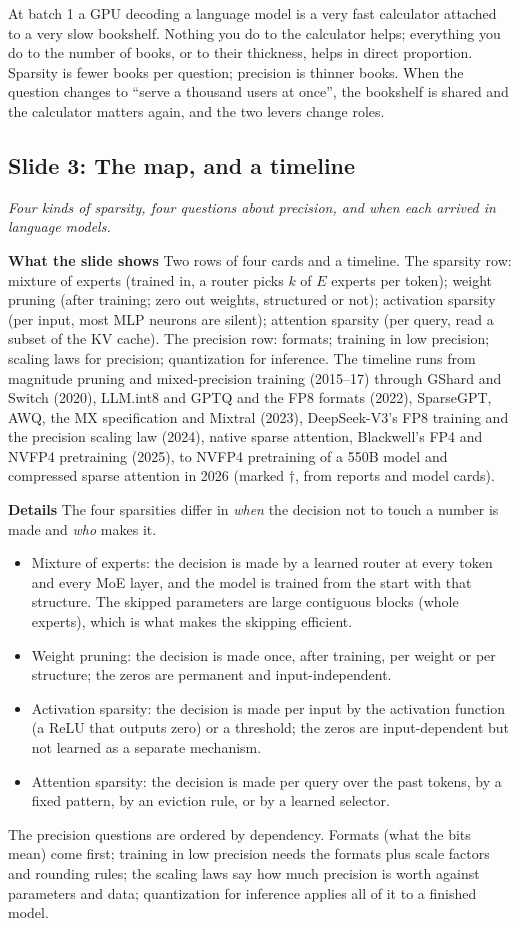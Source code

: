 \documentclass[11pt,letterpaper]{article}
\newcommand{\slide}[3]{%
  \subsection[Slide #1: #2]{Slide #1: #2}%
  {\color{muted}\itshape #3\par}\medskip}
\newcommand{\para}[1]{\medskip\noindent\textbf{#1}\quad}
\newenvironment{intuition}{\begin{tcolorbox}[intuitionbox]}{\end{tcolorbox}}
\begin{document}
\begin{intuition}
At batch 1 a GPU decoding a language model is a very fast calculator attached to a very slow bookshelf. Nothing you do to the calculator helps; everything you do to the number of books, or to their thickness, helps in direct proportion. Sparsity is fewer books per question; precision is thinner books. When the question changes to ``serve a thousand users at once'', the bookshelf is shared and the calculator matters again, and the two levers change roles.
\end{intuition}

\slide{3}{The map, and a timeline}{Four kinds of sparsity, four questions about precision, and when each arrived in language models.}

\para{What the slide shows} Two rows of four cards and a timeline. The sparsity row: mixture of experts (trained in, a router picks $k$ of $E$ experts per token); weight pruning (after training; zero out weights, structured or not); activation sparsity (per input, most MLP neurons are silent); attention sparsity (per query, read a subset of the KV cache). The precision row: formats; training in low precision; scaling laws for precision; quantization for inference. The timeline runs from magnitude pruning and mixed-precision training (2015--17) through GShard and Switch (2020), LLM.int8 and GPTQ and the FP8 formats (2022), SparseGPT, AWQ, the MX specification and Mixtral (2023), DeepSeek-V3's FP8 training and the precision scaling law (2024), native sparse attention, Blackwell's FP4 and NVFP4 pretraining (2025), to NVFP4 pretraining of a 550B model and compressed sparse attention in 2026 (marked $\dagger$, from reports and model cards).

\para{Details} The four sparsities differ in \emph{when} the decision not to touch a number is made and \emph{who} makes it.
\begin{itemize}
  \item Mixture of experts: the decision is made by a learned router at every token and every MoE layer, and the model is trained from the start with that structure. The skipped parameters are large contiguous blocks (whole experts), which is what makes the skipping efficient.
  \item Weight pruning: the decision is made once, after training, per weight or per structure; the zeros are permanent and input-independent.
  \item Activation sparsity: the decision is made per input by the activation function (a ReLU that outputs zero) or a threshold; the zeros are input-dependent but not learned as a separate mechanism.
  \item Attention sparsity: the decision is made per query over the past tokens, by a fixed pattern, by an eviction rule, or by a learned selector.
\end{itemize}
The precision questions are ordered by dependency. Formats (what the bits mean) come first; training in low precision needs the formats plus scale factors and rounding rules; the scaling laws say how much precision is worth against parameters and data; quantization for inference applies all of it to a finished model.
\end{document}
